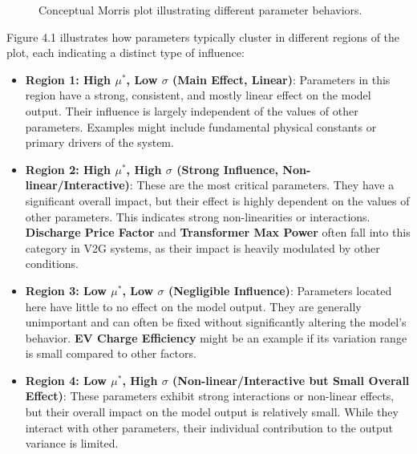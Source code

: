 \begin{figure}[H]
    \caption{Conceptual Morris plot illustrating different parameter behaviors.}
    \label{fig:morris_plot_interpretation}
\end{figure}

Figure 4.1 illustrates how parameters typically cluster in different regions of the plot, each indicating a distinct type of influence:
\begin{itemize}
    \item \textbf{Region 1: High $\mu^*$, Low $\sigma$ (Main Effect, Linear)}: Parameters in this region have a strong, consistent, and mostly linear effect on the model output. Their influence is largely independent of the values of other parameters. Examples might include fundamental physical constants or primary drivers of the system.
    \item \textbf{Region 2: High $\mu^*$, High $\sigma$ (Strong Influence, Non-linear/Interactive)}: These are the most critical parameters. They have a significant overall impact, but their effect is highly dependent on the values of other parameters. This indicates strong non-linearities or interactions. \textbf{Discharge Price Factor} and \textbf{Transformer Max Power} often fall into this category in V2G systems, as their impact is heavily modulated by other conditions.
    \item \textbf{Region 3: Low $\mu^*$, Low $\sigma$ (Negligible Influence)}: Parameters located here have little to no effect on the model output. They are generally unimportant and can often be fixed without significantly altering the model's behavior. \textbf{EV Charge Efficiency} might be an example if its variation range is small compared to other factors.
    \item \textbf{Region 4: Low $\mu^*$, High $\sigma$ (Non-linear/Interactive but Small Overall Effect)}: These parameters exhibit strong interactions or non-linear effects, but their overall impact on the model output is relatively small. While they interact with other parameters, their individual contribution to the output variance is limited.

\end{itemize}

